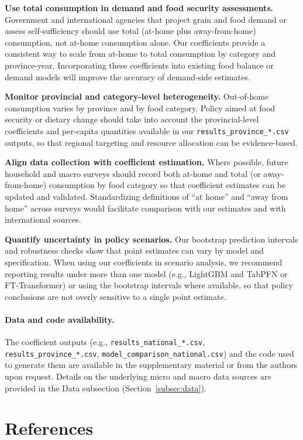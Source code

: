 \documentclass[12pt,a4paper]{article}
\begin{document}
\textbf{Use total consumption in demand and food security assessments.} Government and international agencies that project grain and food demand or assess self-sufficiency should use total (at-home plus away-from-home) consumption, not at-home consumption alone. Our coefficients provide a consistent way to scale from at-home to total consumption by category and province-year. Incorporating these coefficients into existing food balance or demand models will improve the accuracy of demand-side estimates.

\textbf{Monitor provincial and category-level heterogeneity.} Out-of-home consumption varies by province and by food category. Policy aimed at food security or dietary change should take into account the provincial-level coefficients and per-capita quantities available in our \texttt{results\_province\_*.csv} outputs, so that regional targeting and resource allocation can be evidence-based.

\textbf{Align data collection with coefficient estimation.} Where possible, future household and macro surveys should record both at-home and total (or away-from-home) consumption by food category so that coefficient estimates can be updated and validated. Standardizing definitions of ``at home'' and ``away from home'' across surveys would facilitate comparison with our estimates and with international sources.

\textbf{Quantify uncertainty in policy scenarios.} Our bootstrap prediction intervals and robustness checks show that point estimates can vary by model and specification. When using our coefficients in scenario analysis, we recommend reporting results under more than one model (e.g., LightGBM and TabPFN or FT-Transformer) or using the bootstrap intervals where available, so that policy conclusions are not overly sensitive to a single point estimate.

\paragraph{Data and code availability.} The coefficient outputs (e.g., \texttt{results\_national\_*.csv}, \texttt{results\_province\_*.csv}, \texttt{model\_comparison\_national.csv}) and the code used to generate them are available in the supplementary material or from the authors upon request. Details on the underlying micro and macro data sources are provided in the Data subsection (Section~\ref{subsec:data}).

\section*{References}



\end{document}
